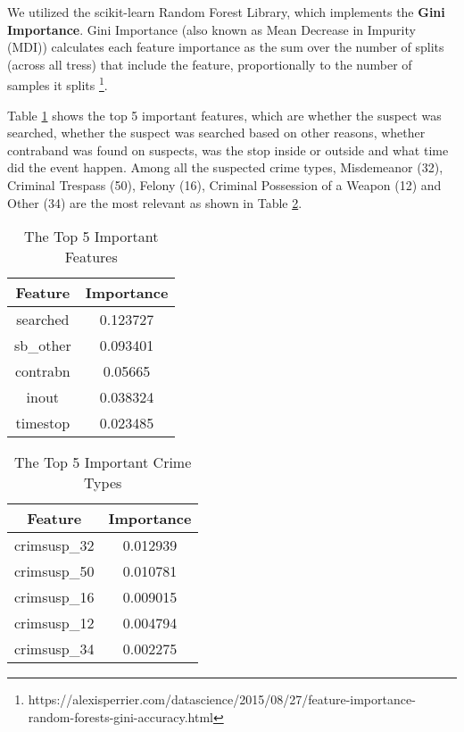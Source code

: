 We utilized the scikit-learn Random Forest Library, which implements the \textbf{Gini Importance}. Gini Importance (also known as Mean Decrease in Impurity (MDI)) calculates each feature importance as the sum over the number of splits (across all tress) that include the feature, proportionally to the number of samples it splits \footnote{https://alexisperrier.com/datascience/2015/08/27/feature-importance-random-forests-gini-accuracy.html}.

Table \ref{tab:ip5} shows the top 5 important features, which are whether the suspect was searched, whether the suspect was searched based on other reasons, whether contraband was found on suspects, was the stop inside or outside and what time did the event happen.
Among all the suspected crime types, Misdemeanor (32), Criminal Trespass (50), Felony (16), Criminal Possession of a Weapon (12) and Other (34) are the most relevant as shown in Table \ref{tab:crim}.

\begin{table}[htbp]
    \centering
    \begin{tabular}{cc} \hline
    \textbf{Feature} & \textbf{Importance} \\ \hline
    searched         & 0.123727            \\
    sb\_other        & 0.093401            \\
    contrabn         & 0.05665             \\
    inout            & 0.038324            \\
    timestop         & 0.023485           \\ \hline
    \end{tabular}
    \caption{The Top 5 Important Features}
    \label{tab:ip5}
\end{table}

\begin{table}[htbp]
    \centering
    \begin{tabular}{cc} \hline
    \textbf{Feature} & \textbf{Importance} \\ \hline
    crimsusp\_32     & 0.012939            \\
    crimsusp\_50     & 0.010781            \\
    crimsusp\_16     & 0.009015            \\
    crimsusp\_12     & 0.004794            \\
    crimsusp\_34     & 0.002275           \\ \hline
    \end{tabular}
    \caption{The Top 5 Important Crime Types}
    \label{tab:crim}
\end{table}

